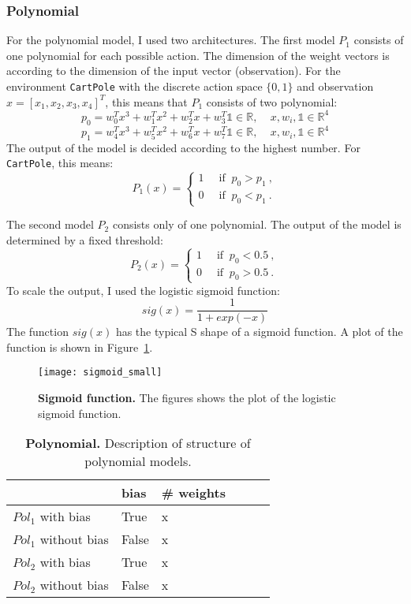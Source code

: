 \subsubsection{Polynomial}
For the polynomial model, I used two architectures. The first model $P_1$ consists of one polynomial for each possible action. The dimension of the weight vectors is according to the dimension of the input vector (observation). For the environment \verb|CartPole| with the discrete action space $\{0, 1\}$ and observation $x = [x_1, x_2, x_3, x_4]^T$, this means that $P_1$ consists of two polynomial:
\[
  p_0 = w_0^T x^3 + w_1^T x^2 + w_2^T x + w_3^T \mathbb{1} \in \mathbb{R}, \ \ \ \ \ x, w_i, \mathbb{1} \in \mathbb{R}^4
\]
\[
  p_1 = w_4^T x^3 + w_5^T x^2 + w_6^T x + w_7^T \mathbb{1} \in \mathbb{R}, \ \ \ \ \ x, w_i, \mathbb{1} \in \mathbb{R}^4
\]
The output of the model is decided according to the highest number. For \verb|CartPole|, this means:
\[
  P_1(x) =
  \begin{cases}1~&{\text{ if }}~p_0>p_1~,\\0~&{\text{ if }}~p_0<p_1~.\end{cases}
\]

The second model $P_2$ consists only of one polynomial. The output of the model is determined by a fixed threshold:
\[
  P_2(x) =
  \begin{cases}1~&{\text{ if }}~p_0<0.5~,\\0~&{\text{ if }}~p_0>0.5~.\end{cases}
\]
To scale the output, I used the logistic sigmoid function:
\[
  sig(x) = \frac{1}{1 + exp(-x)}
\]
The function $sig(x)$ has the typical S shape of a sigmoid function. A plot of the function is shown in Figure~\ref{fig:sigmoid}.

\begin{figure}[ht]
\centering
\texttt{[image: sigmoid\_small]}
\caption[Simoid function]{
  \textbf{Sigmoid function.}
  The figures shows the plot of the logistic sigmoid function.
}
\label{fig:sigmoid}
\end{figure}

\begin{table}[h!] %
\label{tab:example}
\center
\begin{tabular}{m{40mm}lllll}
  \toprule
  & bias & \# weights \\
  \midrule
  $Pol_1$ with bias & True & x \\
  $Pol_1$ without bias & False & x \\
  $Pol_2$ with bias & True & x \\
  $Pol_2$ without bias & False & x \\
  \bottomrule
  \end{tabular}
  \caption[Example]{%
    \textbf{Polynomial.}
    Description of structure of polynomial models.
  }
\end{table}


